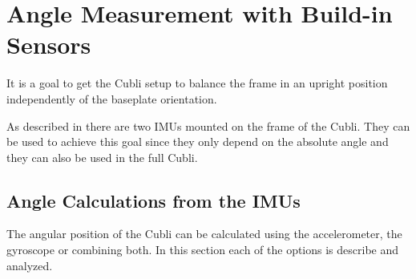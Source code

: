 \chapter{Angle Measurement with Build-in Sensors}\label{chap:CompFilter}
It is a goal to get the Cubli setup to balance the frame in an upright position independently of the baseplate orientation.

As described in  there are two IMUs mounted on the frame of the Cubli. They can be used to achieve this goal since they only depend on the absolute angle and they can also be used in the full Cubli.

\section{Angle Calculations from the IMUs}
The angular position of the Cubli can be calculated using the accelerometer, the gyroscope or combining both. In this section each of the options is describe and analyzed.

